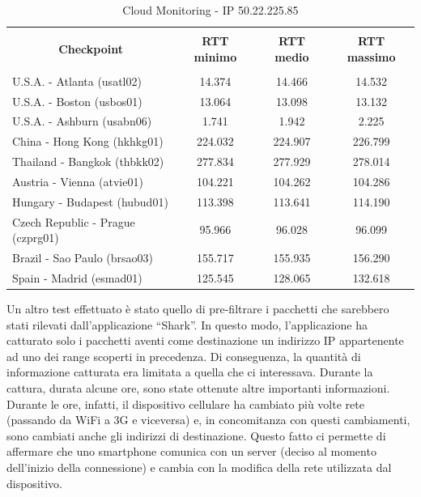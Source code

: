 \documentclass[a4paper,11pt]{book}
\begin{document}
\begin{table}[!ht]
\caption{Cloud Monitoring - IP 50.22.225.85}\label{table:Monitoring_5}
\begin{tabular}{|l|c|c|c|}
\hline
\multicolumn{1}{|c|}{\textbf{}} & {\textbf{}} & {\textbf{}} & {\textbf{}}\\
\multicolumn{1}{|c|}{\textbf{Checkpoint}} & {\textbf{RTT minimo}} & {\textbf{RTT medio}} & {\textbf{RTT massimo}}\\
\multicolumn{1}{|c|}{\textbf{}} & {\textbf{}} & {\textbf{}} & {\textbf{}}\\
\hline
U.S.A. - Atlanta (usatl02) & 14.374 & 14.466 & 14.532\\
U.S.A. - Boston (usbos01) & 13.064 & 13.098 & 13.132\\
U.S.A. - Ashburn (usabn06) & 1.741 & 1.942 & 2.225\\
China - Hong Kong (hkhkg01) & 224.032 & 224.907 & 226.799\\
Thailand - Bangkok (thbkk02) & 277.834 & 277.929 & 278.014\\
Austria - Vienna (atvie01) & 104.221 & 104.262 & 104.286\\
Hungary - Budapest (hubud01) & 113.398 & 113.641 & 114.190\\
Czech Republic - Prague (czprg01) & 95.966 & 96.028 & 96.099\\
Brazil - Sao Paulo (brsao03) & 155.717 & 155.935 & 156.290\\
Spain - Madrid (esmad01) & 125.545 & 128.065 & 132.618\\
\hline
\end{tabular}
\end{table}

\clearpage

Un altro test effettuato \`e stato quello di pre-filtrare i pacchetti che sarebbero stati rilevati dall'applicazione ``Shark''. In questo modo, l'applicazione ha catturato solo i pacchetti aventi come destinazione un indirizzo IP appartenente ad uno dei range scoperti in precedenza.
Di conseguenza, la quantit\`a di informazione catturata era limitata a quella che ci interessava.
Durante la cattura, durata alcune ore, sono state ottenute altre importanti informazioni. Durante le ore, infatti, il dispositivo cellulare ha cambiato più volte rete (passando da WiFi a 3G e viceversa) e, in concomitanza con questi cambiamenti, sono cambiati anche gli indirizzi di destinazione.
Questo fatto ci permette di affermare che uno smartphone comunica con un server (deciso al momento dell'inizio della connessione) e cambia con la modifica della rete utilizzata dal dispositivo.
\end{document}
